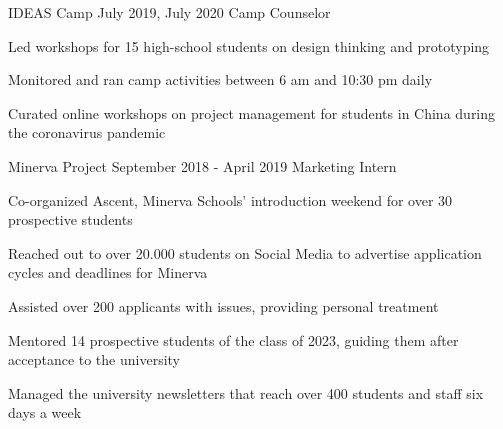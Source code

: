 \begin{exclude}
\begin{experience}
                   {IDEAS Camp}
                   {July 2019, July 2020}
                   {Camp Counselor}
    \item Led workshops for 15 high-school students on design thinking and prototyping
    \item Monitored and ran camp activities between 6 am and 10:30 pm daily
    \item Curated online workshops on project management for students in China during the coronavirus pandemic
\end{experience}
\end{exclude}

\begin{exclude}
    \begin{experience}
                   {Minerva Project}
                   {September 2018 - April 2019}
                   {Marketing Intern}
\item Co-organized Ascent, Minerva Schools’ introduction weekend for over 30 prospective students
\item Reached out to over 20.000 students on Social Media to advertise application cycles and deadlines for Minerva
\item Assisted over 200 applicants with issues, providing personal treatment
\item Mentored 14 prospective students of the class of 2023, guiding them after acceptance to the university
\item Managed the university newsletters that reach over 400 students and staff six days a week
\end{experience}
\end{exclude}